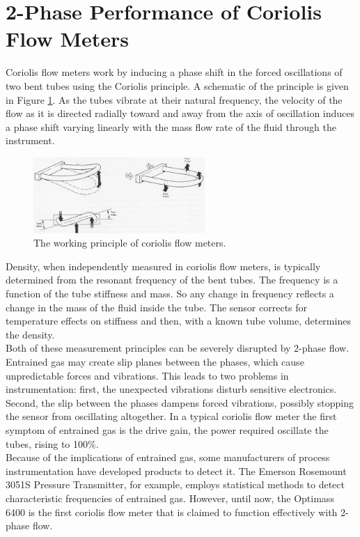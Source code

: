 \documentclass{report}
\begin{document}
\section{2-Phase Performance of Coriolis Flow Meters}
\FloatBarrier
Coriolis flow meters work by inducing a phase shift in the forced oscillations of two bent tubes using the Coriolis principle. A schematic of the principle is given in Figure \ref{fig:coriolis}. As the tubes vibrate at their natural frequency, the velocity of the flow as it is directed radially toward and away from the axis of oscillation induces a phase shift varying linearly with the mass flow rate of the fluid through the instrument. \cite{ISO}\cite{O'Banion 2013}  \\
\begin{figure}[h]
\centering
\includegraphics[width=0.58\textwidth]{coriolis}
\caption{The working principle of coriolis flow meters. \cite{coriolisPrinciple}}
\label{fig:coriolis}
\end{figure}
\FloatBarrier
Density, when independently measured in coriolis flow meters, is typically determined from the resonant frequency of the bent tubes. \cite{ISO}\cite{O'Banion 2013} The frequency is a function of the tube stiffness and mass. So any change in frequency reflects a change in the mass of the fluid inside the tube. The sensor corrects for temperature effects on stiffness and then, with a known tube volume, determines the density. \cite{ISO}\\
Both of these measurement principles can be severely disrupted by 2-phase flow. Entrained gas may create slip planes between the phases, which cause unpredictable forces and vibrations.\cite{ISO}\cite{processArticle}\cite{emerson2Phase} This leads to two problems in instrumentation: first, the unexpected vibrations disturb sensitive electronics. Second, the slip between the phases dampens forced vibrations, possibly stopping the sensor from oscillating altogether. In a typical coriolis flow meter the first symptom of entrained gas is the drive gain, the power required oscillate the tubes, rising to 100\%. \cite{ISO}\cite{emerson youtube}\\
Because of the implications of entrained gas, some manufacturers of process instrumentation have developed products to detect it. The Emerson Rosemount 3051S Pressure Transmitter, for example, employs statistical methods to detect characteristic frequencies of entrained gas. \cite{emerson EGM} However, until now, the Optimass 6400 is the first coriolis flow meter that is claimed to function effectively with 2-phase flow.
\end{document}
